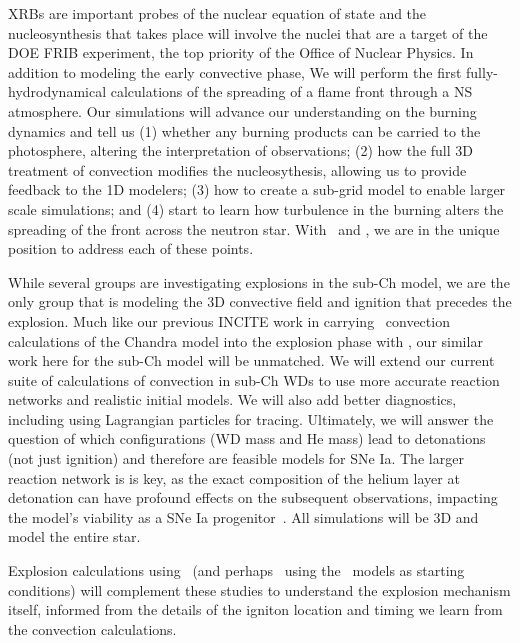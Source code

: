 \documentclass[11pt,letterpaper,english]{article}
\begin{document}
XRBs are important probes of the nuclear equation of state and the
nucleosynthesis that takes place will involve the nuclei that are a
target of the DOE FRIB experiment, the top priority of the Office of
Nuclear Physics.  In addition to modeling the early convective phase,
We will perform the first fully-hydrodynamical calculations of the
spreading of a flame front through a NS atmosphere.  Our simulations
will advance our understanding on the burning dynamics and tell us (1)
whether any burning products can be carried to the photosphere,
altering the interpretation of observations; (2) how the full 3D
treatment of convection modifies the nucleosythesis, allowing us to
provide feedback to the 1D modelers; (3) how to create a sub-grid
model to enable larger scale simulations; and (4) start to learn how
turbulence in the burning alters the spreading of the front across the
neutron star.  With \maestro\ and \castro, we are in the unique
position to address each of these points.

While several groups are investigating explosions in the sub-Ch model,
we are the only group that is modeling the 3D convective field and
ignition that precedes the explosion.  Much like our previous INCITE
work in carrying \maestro\ convection calculations of the Chandra
model into the explosion phase with \castro, our similar work here for
the sub-Ch model will be unmatched.  We will extend our current suite
of calculations of convection in sub-Ch WDs to use more accurate
reaction networks and realistic initial models.  We will also add
better diagnostics, including using Lagrangian particles for tracing.
Ultimately, we will answer the question of which configurations (WD
mass and He mass) lead to detonations (not just ignition) and
therefore are feasible models for SNe Ia.  The larger reaction network
is is key, as the exact composition of the helium layer at detonation
can have profound effects on the subsequent observations, impacting
the model's viability as a SNe Ia progenitor~\cite{kromer:2010}.  All
simulations will be 3D and model the entire star.

Explosion calculations using \flash\ (and perhaps \castro\ using the
\maestro\ models as starting conditions) will complement these studies
to understand the explosion mechanism itself, informed from the
details of the igniton location and timing we learn from the
convection calculations.
 
\end{document}
